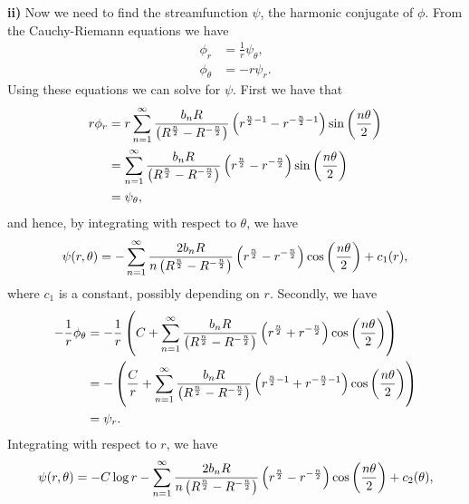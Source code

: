 \documentclass{article}
\begin{document}
\textbf{ii)} Now we need to find the streamfunction $\psi$, the harmonic
conjugate of $\phi$. From the Cauchy-Riemann equations we have
%
\begin{align*}
    \phi_r &= \frac{1}{r} \psi_\theta, \\
    \phi_\theta &= - r \psi_r
    .
\end{align*}
%
Using these equations we can solve for $\psi$. First we have that
%
\begin{align*}
    r \phi_r &=
        r \sum_{n = 1}^\infty
            \frac{b_n R}{\del{R^{\frac{n}{2}} - R^{- \frac{n}{2}}}} \del{r^{\frac{n}{2} - 1} - r^{- \frac{n}{2} - 1}}
        \sin \del{\frac{n \theta}{2}}
        \\
         &= \sum_{n = 1}^\infty
            \frac{b_n R}{\del{R^{\frac{n}{2}} - R^{- \frac{n}{2}}}} \del{r^{\frac{n}{2}} - r^{- \frac{n}{2}}}
        \sin \del{\frac{n \theta}{2}}
        \\
         &= \psi_\theta
         ,
\end{align*}
%
and hence, by integrating with respect to $\theta$, we have
%
\begin{equation}
    \psi(r, \theta)
        = - \sum_{n = 1}^\infty
            \frac{2 b_n R}{n \del{R^{\frac{n}{2}} - R^{- \frac{n}{2}}}} \del{r^{\frac{n}{2}} - r^{- \frac{n}{2}}}
        \cos \del{\frac{n \theta}{2}}
        + c_1(r)
        \label{eq:A-bi}
        ,
\end{equation}
%
where $c_1$ is a constant, possibly depending on $r$. Secondly, we have
%
\begin{align*}
    - \frac{1}{r} \phi_\theta
        &=
            - \frac{1}{r}
            \del{
                C
                + \sum_{n = 1}^\infty
                    \frac{b_n R}{\del{R^{\frac{n}{2}} - R^{- \frac{n}{2}}}} \del{r^{\frac{n}{2}} + r^{- \frac{n}{2}}}
                \cos \del{\frac{n \theta}{2}}
            }
            \\
        &=
            - \del{
                \frac{C}{r}
                + \sum_{n = 1}^\infty
                    \frac{b_n R}{\del{R^{\frac{n}{2}} - R^{- \frac{n}{2}}}} \del{r^{\frac{n}{2} - 1} + r^{- \frac{n}{2} - 1}}
                \cos \del{\frac{n \theta}{2}}
            }
            \\
        &= \psi_r
        .
\end{align*}
%
Integrating with respect to $r$, we have
%
\begin{equation}
    \psi(r, \theta)
        = - C \log r - \sum_{n = 1}^\infty
            \frac{2 b_n R}{n \del{R^{\frac{n}{2}} - R^{- \frac{n}{2}}}} \del{r^{\frac{n}{2}} - r^{- \frac{n}{2}}}
        \cos \del{\frac{n \theta}{2}}
        + c_2(\theta)
        \label{eq:A-bii}
        ,
\end{equation}
\end{document}
